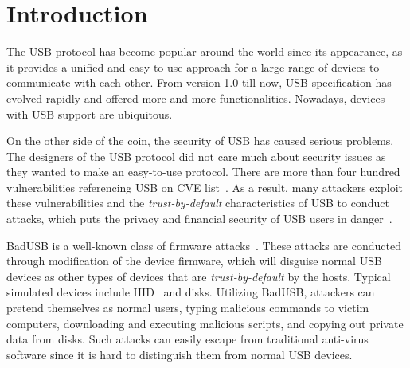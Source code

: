 \section{Introduction}
\label{sec:introduction}

The \ac{USB} protocol has become popular around the world
since its appearance, as it provides a unified and easy-to-use approach for a
large range of devices to communicate with each other.  From version 1.0 till
now, \ac{USB} specification has evolved rapidly and offered more and more
functionalities.  Nowadays, devices with \ac{USB} support are ubiquitous.

On the other side of the coin, the security of \ac{USB} has caused serious problems.
The designers of the \ac{USB} protocol did not care much about security issues as
they wanted to make an easy-to-use protocol.  There are more than four hundred
vulnerabilities referencing \ac{USB} on CVE list~\cite{website:CVE-list}.  As a
result, many attackers exploit these vulnerabilities and the
\textit{trust-by-default} characteristics of \ac{USB} to conduct attacks, which puts
the privacy and financial security of \ac{USB} users in danger~\cite{sok}.

BadUSB is a well-known class of firmware attacks~\cite{badusb}.  These attacks
are conducted through modification of the device firmware, which will disguise
normal \ac{USB} devices as other types of devices that are \textit{trust-by-default}
by the hosts.  Typical simulated devices include \ac{HID}~\cite{hid} and disks.  Utilizing BadUSB,
attackers can pretend themselves as normal users, typing malicious commands to
victim computers, downloading and executing malicious scripts, and copying out
private data from disks.  Such attacks can easily escape from traditional
anti-virus software since it is hard to distinguish them from normal \ac{USB}
devices.

